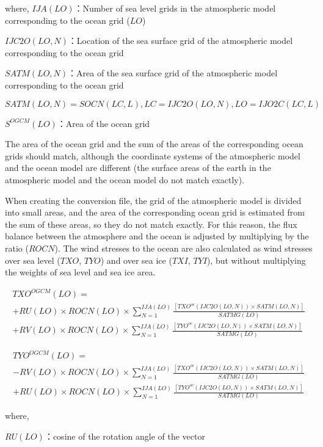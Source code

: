 where, \(IJA(LO)\)：Number of sea level grids in the atmospheric model
corresponding to the ocean grid (\(LO\))

\(IJC2O(LO,N)\)：Location of the sea surface grid of the atmospheric
model corresponding to the ocean grid

\(SATM(LO,N)\)：Area of the sea surface grid of the atmospheric model
corresponding to the ocean grid

\(SATM(LO,N)=SOCN(LC,L),LC=IJC2O(LO,N),LO=IJO2C(LC,L)\)

\(S^{OGCM}(LO)\)：Area of the ocean grid

The area of the ocean grid and the sum of the areas of the corresponding
ocean grids should match, although the coordinate systems of the
atmospheric model and the ocean model are different (the surface areas
of the earth in the atmospheric model and the ocean model do not match
exactly).

When creating the conversion file, the grid of the atmospheric model is
divided into small areas, and the area of the corresponding ocean grid
is estimated from the sum of these areas, so they do not match exactly.
For this reason, the flux balance between the atmosphere and the ocean
is adjusted by multiplying by the ratio (\(ROCN\)). The wind stresses to
the ocean are also calculated as wind stresses over sea level (\(TXO\),
\(TYO\)) and over sea ice (\(TXI\), \(TYI\)), but without multiplying
the weights of sea level and sea ice area.

\begin{eqnarray} TXO^{OGCM}(LO) =  \\ + RU(LO) \times ROCN(LO) \times \sum_{N=1}^{IJA(LO)} \frac{[TXO^{oc}(IJC2O(LO,N)) \times SATM(LO,N)]}{SATMG(LO)} \\ + RV(LO) \times ROCN(LO) \times \sum_{N=1}^{IJA(LO)}\frac{[TYO^{oc}(IJC2O(LO,N)) \times SATM(LO,N)]}{SATMG(LO)} \end{eqnarray}

\begin{eqnarray} TYO^{OGCM}(LO)= \\ -RV(LO) \times ROCN(LO) \times \sum_{N=1}^{IJA(LO)} \frac{[TXO^{oc}(IJC2O(LO,N)) \times SATM(LO,N)]}{SATMG(LO)} \\ + RU(LO) \times ROCN(LO) \times \sum_{N=1}^{IJA(LO)}\frac{[TYO^{oc}(IJC2O(LO,N)) \times SATM(LO,N)]}{SATMG(LO)} \end{eqnarray}

where,

\(RU(LO)\)：cosine of the rotation angle of the vector

